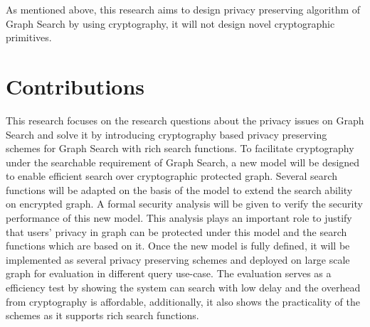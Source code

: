 As mentioned above, this research aims to design privacy preserving algorithm of Graph Search by using cryptography, it will not design novel cryptographic primitives. 

\section{Contributions}
This research focuses on the research questions about the privacy issues on Graph Search and solve it by introducing cryptography based privacy preserving schemes for Graph Search with rich search functions. 
To facilitate cryptography under the searchable requirement of Graph Search, a new model will be designed to enable efficient search over cryptographic protected graph. Several search functions will be adapted on the basis of the model to extend the search ability on encrypted graph. 
A formal security analysis will be given to verify the security performance of this new model. This analysis plays an important role to justify that users' privacy in graph can be protected under this model and the search functions which are based on it. 
Once the new model is fully defined, it will be implemented as several privacy preserving schemes and deployed on large scale graph for evaluation in different query use-case. The evaluation serves as a efficiency test by showing the system can search with low delay and the overhead from cryptography is affordable, additionally, it also shows the practicality of the schemes as it supports rich search functions.






